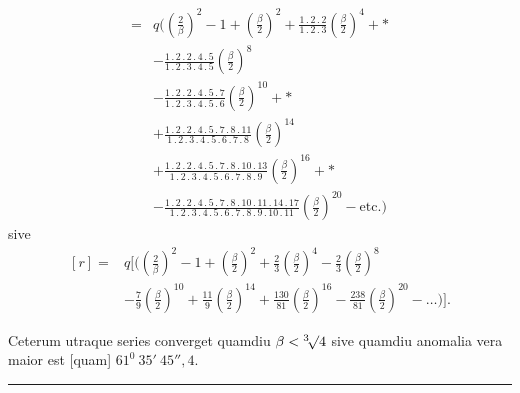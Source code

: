 \[
\begin{aligned}
={}&q\Biggl(\left(\frac2\beta\right)^2-1+\left(\frac\beta2\right)^2
+\frac{1\mathpunct{.}2\mathpunct{.}2}{1\mathpunct{.}2\mathpunct{.}3}\left(\frac\beta2\right)^4+\ast\\
&-\frac{1\mathpunct{.}2\mathpunct{.}2\mathpunct{.}4\mathpunct{.}5}{1\mathpunct{.}2\mathpunct{.}3\mathpunct{.}4\mathpunct{.}5}\left(\frac\beta2\right)^8\\
&-\frac{1\mathpunct{.}2\mathpunct{.}2\mathpunct{.}4\mathpunct{.}5\mathpunct{.}7}{1\mathpunct{.}2\mathpunct{.}3\mathpunct{.}4\mathpunct{.}5\mathpunct{.}6}\left(\frac\beta2\right)^{10}+\ast\\
&+\frac{1\mathpunct{.}2\mathpunct{.}2\mathpunct{.}4\mathpunct{.}5\mathpunct{.}7\mathpunct{.}8\mathpunct{.}11}{1\mathpunct{.}2\mathpunct{.}3\mathpunct{.}4\mathpunct{.}5\mathpunct{.}6\mathpunct{.}7\mathpunct{.}8}\left(\frac\beta2\right)^{14}\\
&+\frac{1\mathpunct{.}2\mathpunct{.}2\mathpunct{.}4\mathpunct{.}5\mathpunct{.}7\mathpunct{.}8\mathpunct{.}10\mathpunct{.}13}{1\mathpunct{.}2\mathpunct{.}3\mathpunct{.}4\mathpunct{.}5\mathpunct{.}6\mathpunct{.}7\mathpunct{.}8\mathpunct{.}9}\left(\frac\beta2\right)^{16}+\ast\\
&-\frac{1\mathpunct{.}2\mathpunct{.}2\mathpunct{.}4\mathpunct{.}5\mathpunct{.}7\mathpunct{.}8\mathpunct{.}10\mathpunct{.}11\mathpunct{.}14\mathpunct{.}17}{1\mathpunct{.}2\mathpunct{.}3\mathpunct{.}4\mathpunct{.}5\mathpunct{.}6\mathpunct{.}7\mathpunct{.}8\mathpunct{.}9\mathpunct{.}10\mathpunct{.}11}\left(\frac\beta2\right)^{20}-\text{etc.}\Biggr)
\end{aligned}
\]
sive
\[
\begin{aligned}
[r]={}&q\Biggl[\Biggl(\left(\frac2\beta\right)^2-1+\left(\frac\beta2\right)^2
+\frac23\left(\frac\beta2\right)^4-\frac23\left(\frac\beta2\right)^8\\
&-\frac79\left(\frac\beta2\right)^{10}+\frac{11}{9}\left(\frac\beta2\right)^{14}+\frac{130}{81}\left(\frac\beta2\right)^{16}
-\frac{238}{81}\left(\frac\beta2\right)^{20}-\ldots\Biggr)\Biggr].
\end{aligned}
\]
\par
Ceterum utraque series converget quamdiu \(\beta<\BareRoot[3]{4}\) sive quamdiu anomalia vera maior est [quam] \(61^0\ 35'\ 45''{,}4\).
\par\medskip
\begin{center}\rule{.18\textwidth}{.35pt}\end{center}
